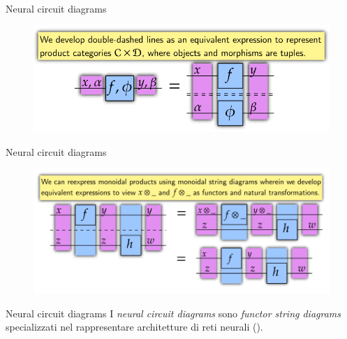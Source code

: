 \documentclass{beamer}
\begin{document}
\begin{frame}{Neural circuit diagrams}
    \begin{figure}
        \begin{center}
            \includegraphics[width=\textwidth]{figures/product_diagram.png}
            \caption*{\cite{abbott2024functor}}
        \end{center}
    \end{figure}
\end{frame}


\begin{frame}{Neural circuit diagrams}
    \begin{figure}
        \begin{center}
            \includegraphics[width=\textwidth]{figures/monoidal_product_diagram.png}
            \caption*{\cite{abbott2024functor}}
        \end{center}
    \end{figure}
\end{frame}

\begin{frame}{Neural circuit diagrams}
    I \textit{neural circuit diagrams} sono \textit{functor string diagrams} specializzati nel rappresentare architetture di reti neurali (\cite{abbott2024functor}).
\end{frame}
\end{document}
